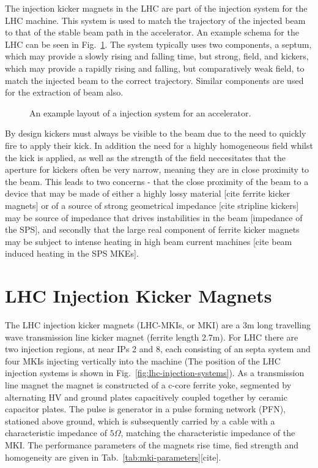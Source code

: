 The injection kicker magnets in the LHC are part of the injection system for the LHC machine. This system is used to match the trajectory of the injected beam to that of the stable beam path in the accelerator. An example schema for the LHC can be seen in Fig.~\ref{fig:injection-system-schema}. The system typically uses two components, a septum, which may provide a slowly rising and falling time, but strong, field, and kickers, which may provide a rapidly rising and falling, but comparatively weak field, to match the injected beam to the correct trajectory. Similar components are used for the extraction of beam also.

\begin{figure}

\label{fig:injection-system-schema}
\caption{An example layout of a injection system for an accelerator.}
\end{figure}

By design kickers must always be visible to the beam due to the need to quickly fire to apply their kick. In addition the need for a highly homogeneous field whilst the kick is applied, as well as the strength of the field neccesitates that the aperture for kickers often be very narrow, meaning they are in close proximity to the beam. This leads to two concerns - that the close proximity of the beam to a device that may be made of either a highly lossy material [cite ferrite kicker magnets] or of a source of strong geometrical impedance [cite stripline kickers] may be source of impedance that drives instabilities in the beam [impedance of the SPS], and secondly that the large real component of ferrite kicker magnets may be subject to intense heating in high beam current machines [cite beam induced heating in the SPS MKEs]. 

\section{LHC Injection Kicker Magnets}

The LHC injection kicker magnets (LHC-MKIs, or MKI) are a 3m long travelling wave transmission line kicker magnet (ferrite length 2.7m). For LHC there are two injection regions, at near IPs 2 and 8, each consisting of an septa system and four MKIs injecting vertically into the machine (The position of the LHC injection systems is shown in Fig.~\ref{fig:lhc-injection-systems}). As a transmission line magnet the magnet is constructed of a c-core ferrite yoke, segmented by alternating HV and ground plates capacitively coupled together by ceramic capacitor plates. The pulse is generator in a pulse forming network (PFN), stationed above ground, which is subsequently carried by a cable with a characteristic impedance of $5 \Omega$, matching the characteristic impedance of the MKI. The performance parameters of the magnets rise time, fied strength and homogeneity are given in Tab.~\ref{tab:mki-parameters}[cite].


